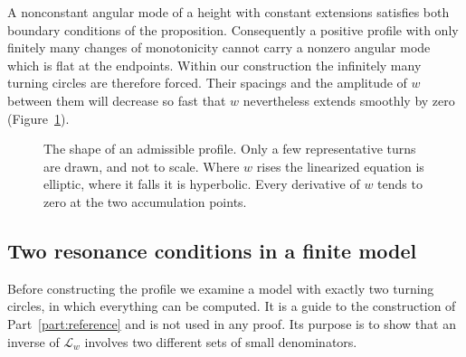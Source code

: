 A nonconstant angular mode of a height with constant extensions
satisfies both boundary conditions of the proposition. Consequently a
positive profile with only finitely many changes of monotonicity cannot
carry a nonzero angular mode which is flat at the endpoints. Within
our construction the infinitely many turning circles are therefore
forced. Their spacings and the amplitude of $w$ between them will
decrease so fast that $w$ nevertheless extends smoothly by zero
(Figure~\ref{fig:profile-type}).

\begin{figure}[htbp]
\centering
{}
\caption{The shape of an admissible profile. Only a few representative
turns are drawn, and not to scale. Where $w$ rises the linearized
equation is elliptic, where it falls it is hyperbolic. Every derivative
of $w$ tends to zero at the two accumulation points.}
\label{fig:profile-type}
\end{figure}

\subsection{Two resonance conditions in a finite model}
\label{sec:worked-example}

Before constructing the profile we examine a model with exactly two
turning circles, in which everything can be computed. It is a guide to
the construction of Part~\ref{part:reference} and is not used in any
proof. Its purpose is to show that an inverse of $\mathscr L_w$
involves two different sets of small denominators.

